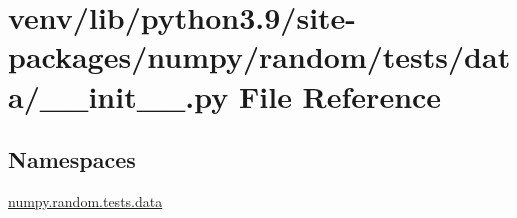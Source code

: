 \hypertarget{venv_2lib_2python3_89_2site-packages_2numpy_2random_2tests_2data_2____init_____8py}{}\section{venv/lib/python3.9/site-\/packages/numpy/random/tests/data/\+\_\+\+\_\+init\+\_\+\+\_\+.py File Reference}
\label{venv_2lib_2python3_89_2site-packages_2numpy_2random_2tests_2data_2____init_____8py}
\subsection*{Namespaces}
\begin{DoxyCompactItemize}
\item 
 \hyperlink{namespacenumpy_1_1random_1_1tests_1_1data}{numpy.\+random.\+tests.\+data}
\end{DoxyCompactItemize}
